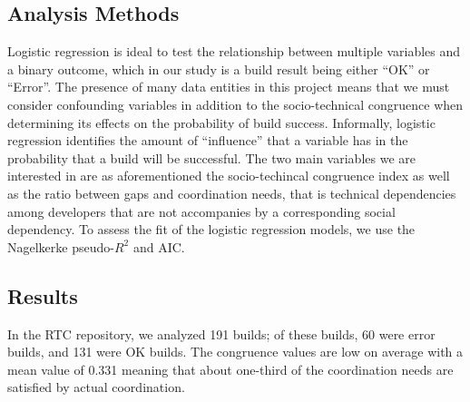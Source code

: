 \subsection{Analysis Methods}
\label{sec:methodology}
Logistic regression is ideal to test the relationship between multiple variables and a binary outcome, which in our study is a build result being either ``OK'' or ``Error''. The presence of many data entities in this project means that we must consider confounding variables in addition to the socio-technical congruence when determining its effects on the probability of build success. Informally, logistic regression identifies the amount of ``influence'' that a variable has in the probability that a build will be successful.
The two main variables we are interested in are as aforementioned the socio-techincal congruence index as well as the ratio between gaps and coordination needs, that is technical dependencies among developers that are not accompanies by a corresponding social dependency.
To assess the fit of the logistic regression models, we use the Nagelkerke pseudo-$R^2$ and AIC. 

\subsection{Results}
\label{sec:results}
In the RTC repository, we analyzed 191 builds; of these builds, 60 were error builds, and 131 were OK builds.
The congruence values are low on average with a mean value of 0.331 meaning that about one-third of the coordination needs are satisfied by actual coordination.

%


